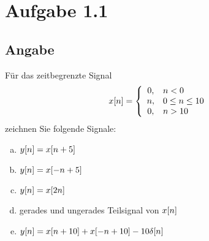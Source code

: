 \section*{Aufgabe 1.1}

\subsection*{Angabe}
 
Für das zeitbegrenzte Signal
	\begin{equation*}
		x\negthinspace\left[n\right] = \left\{\begin{array}{cl} 0, & n<0\\n, & 0\le n\le 10\\0, & n>10 \end{array} \right.
	\end{equation*}
zeichnen Sie folgende Signale:
	\begin{enumerate}[a)] 
		\item $y\negthinspace\left[n\right] = x\negthinspace\left[n+5\right]$
		\item $y\negthinspace\left[n\right] = x\negthinspace\left[-n+5\right]$
		\item $y\negthinspace\left[n\right] = x\negthinspace\left[2n\right]$
		\item gerades und ungerades Teilsignal von $x\negthinspace\left[n\right]$
		\item $y\negthinspace\left[n\right] = x\negthinspace\left[n+10\right]+x\negthinspace\left[-n+10\right]-10\delta\negthinspace\left[n\right]$
	\end{enumerate}

